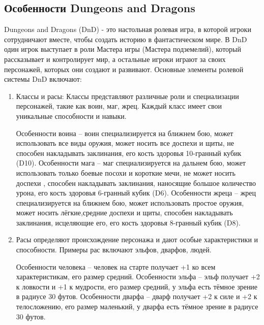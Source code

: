 \subsection{Особенности Dungeons and Dragons}
Dungeons and Dragons (DnD) - это настольная ролевая игра, в которой игроки сотрудничают вместе, чтобы создать историю в фантастическом мире. В DnD один игрок выступает в роли Мастера игры (Мастера подземелий), который рассказывает и контролирует мир, а остальные игроки играют за своих персонажей, которых они создают и развивают.
Основные элементы ролевой системы DnD включают:
	\begin{enumerate} 
		\item Классы и расы: Классы представляют различные роли и специализации персонажей, такие как воин, маг, жрец. Каждый класс имеет свои уникальные способности и навыки.
			
				Особенности воина -- воин специализируется на ближнем бою, может использовать все виды оружия, может носить все доспехи и щиты, не способен накладывать заклинания, его кость здоровья 10-гранный кубик (D10).
				 Особенности мага -- маг специализируется на дальнем бою, может использовать только боевые посохи и короткие мечи, не может носить доспехи , способен накладывать заклинания, наносящие большое количество урона, его кость здоровья 6-гранный кубик (D6).
				Особенности жреца -- жрец специализируется на ближнем бою, может использовать простое оружия, может носить лёгкие,средние доспехи и щиты, способен накладывать заклинания, исцеляющие его, его кость здоровья 8-гранный кубик (D8).
			
		\item Расы определяют происхождение персонажа и дают особые характеристики и способности. Примеры рас включают эльфов, дварфов, людей.
			
			 Особенности человека -- человек на старте получает +1 ко всем характеристикам, его размер средний.
			 Особенности эльфа -- эльф получает +2 к ловкости и +1 к мудрости, его размер средний, у эльфа есть тёмное зрение в радиусе 30 футов.
			 Особенности дварфа -- дварф получает +2 к силе и +2 к телосложению, его размер маленький, у дварфа есть тёмное зрение в радиусе 30 футов.
			

\end{enumerate}
